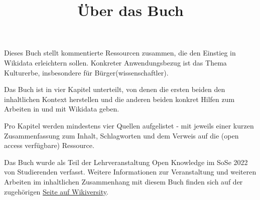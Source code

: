 \documentclass{article}
\begin{document}
\title{Über das Buch}

\maketitle


Dieses Buch stellt kommentierte Ressourcen zusammen, die den Einstieg in Wikidata erleichtern sollen. Konkreter Anwendungsbezug ist das Thema Kulturerbe, insbesondere für Bürger(wissenschaftler). 


Das Buch ist in vier Kapitel unterteilt, von denen die ersten beiden den inhaltlichen Kontext herstellen und die anderen beiden konkret Hilfen zum Arbeiten in und mit Wikidata geben.


Pro Kapitel werden mindestens vier Quellen aufgelistet - mit jeweils einer kurzen Zusammenfassung zum Inhalt, Schlagworten und dem Verweis auf die (open access verfügbare) Ressource.


Das Buch wurde als Teil der Lehrveranstaltung Open Knowledge im SoSe 2022 von Studierenden verfasst. Weitere Informationen zur Veranstaltung und weiteren Arbeiten im inhaltlichen Zusammenhang mit diesem Buch finden sich auf der zugehörigen \href{https://de.wikiversity.org/wiki/OpenKnowledge22}{Seite auf Wikiversity}.
\end{document}
